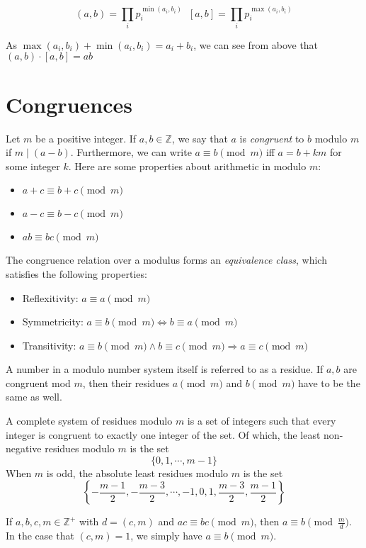 \documentclass{article}
\begin{document}
\begin{multicols*}{2}
\[(a,b) = \prod_{i}p_i^{\min(a_i,b_i)}\;\;[a,b] = \prod_{i}p_i^{\max(a_i, b_i)}\]

As $\max(a_i, b_i) + \min(a_i, b_i) = a_i + b_i$, we can see from above that $(a,b) \cdot [a,b] = ab$

\section{Congruences}


Let $m$ be a positive integer. If $a,b \in \mathbb{Z}$, we say that $a$ is \textit{congruent} to $b$ modulo $m$ if $m \mid (a - b)$. Furthermore, we can write $a \equiv b \pmod{m}$ iff $a = b + km$ for some integer $k$. Here are some properties about arithmetic in modulo $m$:

\begin{itemize}
\item $a+c \equiv b + c \pmod{m}$
\item $a - c \equiv b - c \pmod{m}$
\item $ab \equiv bc \pmod{m}$
\end{itemize}

The congruence relation over a modulus forms an \textit{equivalence class}, which satisfies the following properties:

\begin{itemize}
\item Reflexitivity: $a \equiv a \pmod{m}$
\item Symmetricity: $a \equiv b \pmod{m} \Leftrightarrow b \equiv a \pmod{m}$
\item Transitivity: $a \equiv b \pmod{m} \wedge b \equiv c \pmod{m} \Rightarrow a \equiv c \pmod{m}$
\end{itemize}

A number in a modulo number system itself is referred to as a residue. If $a, b$ are congruent mod $m$, then their residues $a\pmod{m}$ and $b\pmod{m}$ have to be the same as well.

A complete system of residues modulo $m$ is a set of integers such that every integer is congruent to exactly one integer of the set. Of which, the least non-negative residues modulo $m$ is the set \[\{0,1,\cdots,m -1\}\] When $m$ is odd, the absolute least residues modulo $m$ is the set \[\left\{-\frac{m-1}{2}, -\frac{m-3}{2}, \cdots, -1, 0, 1, \frac{m-3}{2}, \frac{m-1}{2}\right\}\]

If $a,b,c,m \in \mathbb{Z}^+$ with $d = (c, m)$ and $ac \equiv bc \pmod{m}$, then $a \equiv b \pmod{\frac{m}{d}}$. In the case that $(c, m) = 1$, we simply have $a \equiv b \pmod{m}$.


\end{multicols*}
\end{document}
